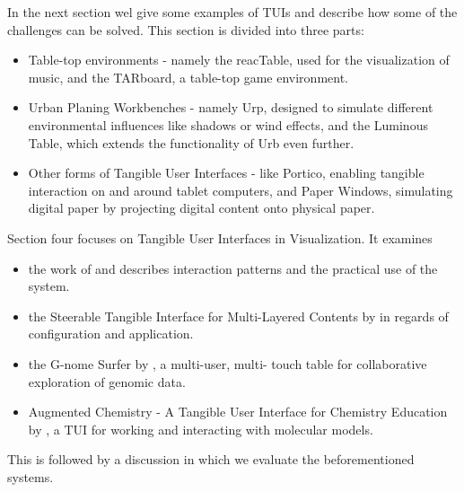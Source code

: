 In the next section wel give some examples of TUIs and describe how some of the challenges can be solved. 
This section is divided into three parts: 
\begin{itemize}
\item Table-top environments - namely the reacTable, used for the visualization of music, and the TARboard, a table-top game environment.
\item Urban Planing Workbenches - namely Urp, designed to simulate different environmental influences like shadows or wind effects, and the Luminous Table, which extends the functionality of Urb even further.
\item Other forms of Tangible User Interfaces - like Portico, enabling tangible interaction on and around tablet computers, and Paper Windows, simulating digital paper by projecting digital content onto physical paper.
\end{itemize}

Section four focuses on Tangible User Interfaces in Visualization. It examines 
\begin{itemize}
\item the work of \cite{spindler10} and describes interaction patterns and the practical use of the system. 
\item the Steerable Tangible Interface for Multi-Layered Contents by \cite{lee09} in regards of configuration and application. 
\item the G-nome Surfer by \cite{shaer10}, a multi-user, multi- touch table for collaborative exploration of genomic data.
\item Augmented Chemistry - A Tangible User Interface for Chemistry Education by \cite{fjeld02}, a TUI for working and interacting with molecular models.
\end{itemize}

This is followed by a discussion in which we evaluate the beforementioned systems.
